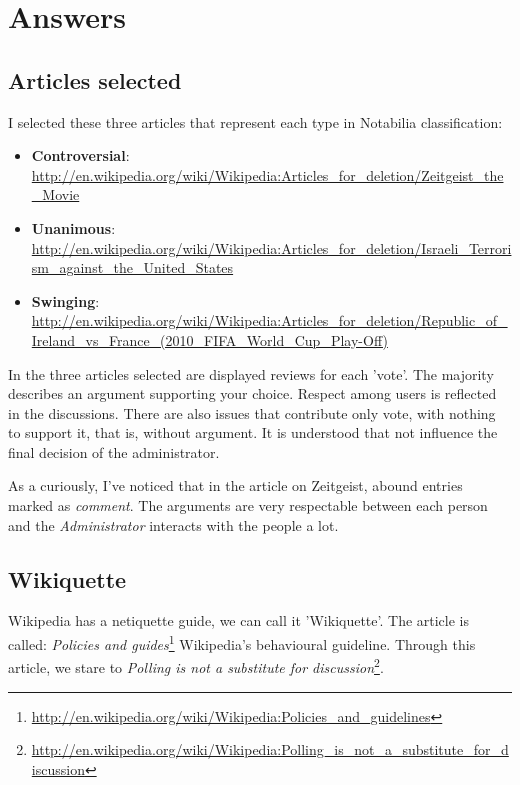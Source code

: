 \documentclass[11pt]{scrartcl}
\begin{document}
\section{Answers}
\label{sec:answers}

\subsection{Articles selected}
\label{sub:list-of-articles}

\par I selected these three articles that represent each type in Notabilia classification:

\begin{itemize}
	\item \textbf{Controversial}: \url{http://en.wikipedia.org/wiki/Wikipedia:Articles_for_deletion/Zeitgeist_the_Movie}
	\item \textbf{Unanimous}: \url{http://en.wikipedia.org/wiki/Wikipedia:Articles_for_deletion/Israeli_Terrorism_against_the_United_States}
	\item \textbf{Swinging}: \url{http://en.wikipedia.org/wiki/Wikipedia:Articles_for_deletion/Republic_of_Ireland_vs_France_(2010_FIFA_World_Cup_Play-Off)}
\end{itemize}

\par In the three articles selected are displayed reviews for each 'vote'. The majority describes an argument supporting your choice. Respect among users is reflected in the discussions.
There are also issues that contribute only vote, with nothing to support it, that is, without argument. It is understood that not influence the final decision of the administrator.

\par As a curiously, I've noticed that in the article on Zeitgeist, abound entries marked as \emph{comment}. The arguments are very respectable between each person and the \emph{Administrator} interacts with the people a lot.

\subsection{Wikiquette}
\label{sub:wikiquette}

\par Wikipedia has a netiquette guide, we can call it 'Wikiquette'. The article is called: \emph{Policies and guides}\footnote{\url{http://en.wikipedia.org/wiki/Wikipedia:Policies_and_guidelines}} Wikipedia's behavioural guideline. Through this article, we stare to \emph{Polling is not a substitute for discussion}\footnote{\url{http://en.wikipedia.org/wiki/Wikipedia:Polling_is_not_a_substitute_for_discussion}}. 
\end{document}
